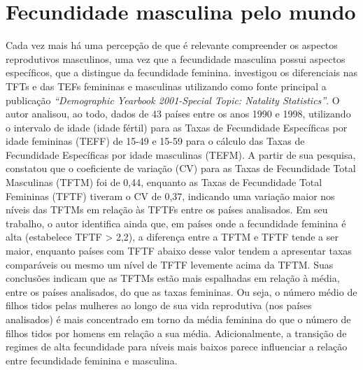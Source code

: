 \section{Fecundidade masculina pelo mundo}\label{tft_tef_mundo}

Cada vez mais há uma percepção de que é relevante compreender os aspectos reprodutivos masculinos, uma vez que a fecundidade masculina possui aspectos específicos, que a distingue da fecundidade feminina.  investigou os diferenciais nas TFTs e das TEFs femininas e masculinas utilizando como fonte principal a publicação \textit{“Demographic Yearbook 2001-Special Topic: Natality Statistics”}\cite{unstatsu25:online2001}. O autor analisou, ao todo, dados de 43 países entre os anos 1990 e 1998, utilizando o intervalo de idade (idade fértil) para as Taxas de Fecundidade Específicas por idade femininas (TEFF) de 15-49 e 15-59 para o cálculo das Taxas de Fecundidade Específicas por idade masculinas (TEFM). A partir de sua pesquisa,  constatou que o coeficiente de variação (CV) para as Taxas de Fecundidade Total Masculinas (TFTM) foi de 0,44, enquanto as Taxas de Fecundidade Total Femininas (TFTF) tiveram o CV de 0,37, indicando uma variação maior nos níveis das TFTMs em relação às TFTFs entre os países analisados. Em seu trabalho, o autor identifica ainda que, em países onde a fecundidade feminina é alta (estabelece TFTF > 2,2), a diferença entre a TFTM e TFTF tende a ser maior, enquanto países com TFTF abaixo desse valor tendem a apresentar taxas comparáveis ou mesmo um nível de TFTF levemente acima da TFTM. Suas conclusões indicam que as TFTMs estão mais espalhadas em relação à média, entre os países analisados, do que as taxas femininas. Ou seja, o número médio de filhos tidos pelas mulheres ao longo de sua vida reprodutiva (nos países analisados) é mais concentrado em torno da média feminina do que o número de filhos tidos por homens em relação a sua média. Adicionalmente, a transição de regimes de alta fecundidade para níveis mais baixos parece influenciar a relação entre fecundidade feminina e  masculina.


